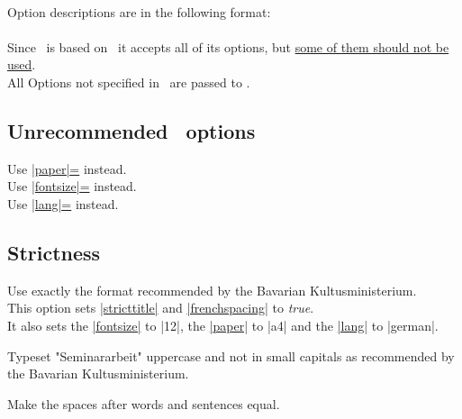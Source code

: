 \noindent\\ Option descriptions are in the following format:\\

 \\


\noindent
Since \wsemclassic\ is based on \report\ it accepts all of its options, but
\hyperlink{subsubsec.unrecomm}{some of them should not be used}.\\

\noindent
All Options not specified in \wsemclassic\ are passed to \report.

\hypertarget{subsubsec.unrecomm}{\subsection{Unrecommended \report\ options}}

 Use \hyperlink{udoc.opt.paper}{|paper|=} instead. \\
 Use \hyperlink{udoc.opt.fontsize}{|fontsize|=} instead. \\
 Use \hyperlink{udoc.opt.lang}{|lang|=} instead.


\subsection{Strictness}

Use exactly the format recommended by the Bavarian Kultusministerium. \\
This option sets \hyperlink{udoc.opt.stricttitle}{|stricttitle|} and
\hyperlink{udoc.opt.frenchspacing}{|frenchspacing|} to \textit{true}. \\
It also sets the \hyperlink{udoc.opt.fontsize}{|fontsize|} to |12|, the
\hyperlink{udoc.opt.paper}{|paper|} to |a4| and the
\hyperlink{udoc.opt.lang}{|lang|} to |german|.

Typeset "Seminararbeit" uppercase and not in small capitals as recommended
by the Bavarian Kultusministerium.

Make the spaces after words and sentences equal.



